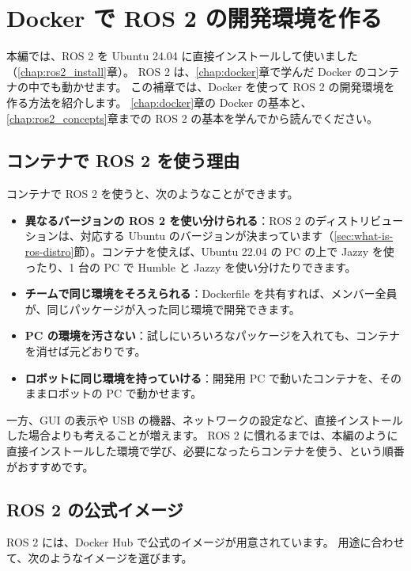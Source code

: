 \chapter{Docker で ROS 2 の開発環境を作る}
\label{sup:docker-ros}

本編では、ROS 2 を Ubuntu 24.04 に直接インストールして使いました（\ref{chap:ros2_install}章）。
ROS 2 は、\ref{chap:docker}章で学んだ Docker のコンテナの中でも動かせます。
この補章では、Docker を使って ROS 2 の開発環境を作る方法を紹介します。
\ref{chap:docker}章の Docker の基本と、\ref{chap:ros2_concepts}章までの ROS 2 の基本を学んでから読んでください。

\section{コンテナで ROS 2 を使う理由}
\label{sec:docker-ros-why}

コンテナで ROS 2 を使うと、次のようなことができます。

\begin{itemize}
  \item \textbf{異なるバージョンの ROS 2 を使い分けられる}：ROS 2 のディストリビューションは、対応する Ubuntu のバージョンが決まっています（\ref{sec:what-is-ros-distro}節）。コンテナを使えば、Ubuntu 22.04 の PC の上で Jazzy を使ったり、1 台の PC で Humble と Jazzy を使い分けたりできます。
  \item \textbf{チームで同じ環境をそろえられる}：Dockerfile を共有すれば、メンバー全員が、同じパッケージが入った同じ環境で開発できます。
  \item \textbf{PC の環境を汚さない}：試しにいろいろなパッケージを入れても、コンテナを消せば元どおりです。
  \item \textbf{ロボットに同じ環境を持っていける}：開発用 PC で動いたコンテナを、そのままロボットの PC で動かせます。
\end{itemize}

一方、GUI の表示や USB の機器、ネットワークの設定など、直接インストールした場合よりも考えることが増えます。
ROS 2 に慣れるまでは、本編のように直接インストールした環境で学び、必要になったらコンテナを使う、という順番がおすすめです。

\section{ROS 2 の公式イメージ}
\label{sec:docker-ros-images}

ROS 2 には、Docker Hub で公式のイメージが用意されています。
用途に合わせて、次のようなイメージを選びます。

